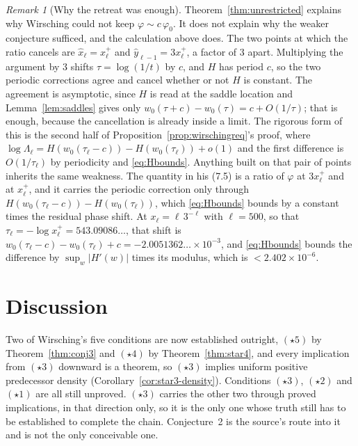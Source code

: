 \documentclass[11pt]{article}
\theoremstyle{definition}
\theoremstyle{remark}
\newtheorem{remark}[theorem]{Remark}
\begin{document}
\begin{remark}[Why the retreat was enough]\label{rem:blindness}
Theorem~\ref{thm:unrestricted} explains why Wirsching could not keep
$\varphi\sim c\,\varphi_0$. It does not explain why the weaker
conjecture sufficed, and the calculation above does. The two points at
which the ratio cancels are $\widehat x_\ell=x_\ell^+$ and
$\widehat y_{\ell-1}=3x_\ell^+$, a factor of $3$ apart. Multiplying the
argument by $3$ shifts $\tau=\log(1/t)$ by $c$, and $H$ has period $c$,
so the two periodic corrections agree and cancel whether or not $H$ is
constant. The agreement is asymptotic, since $H$ is read at the saddle
location and Lemma~\ref{lem:saddles} gives only
$w_0(\tau+c)-w_0(\tau)=c+O(1/\tau)$; that is enough, because the
cancellation is already inside a limit. The rigorous form of this is
the second half of Proposition~\ref{prop:wirschingreq}'s proof, where
$\log\Lambda_\ell = H(w_0(\tau_\ell-c))-H(w_0(\tau_\ell))+o(1)$ and the
first difference is $O(1/\tau_\ell)$ by periodicity and
\eqref{eq:Hbounds}. Anything built on that pair of points inherits the
same weakness. The quantity in his (7.5) is a ratio of $\varphi$ at
$3x_\ell^+$ and at $x_\ell^+$, and it carries the periodic correction
only through $H(w_0(\tau_\ell-c))-H(w_0(\tau_\ell))$, which
\eqref{eq:Hbounds} bounds by a constant times the residual phase shift.
At $x_\ell=\ell\,3^{-\ell}$ with $\ell=500$, so that
$\tau_\ell=-\log x_\ell^+=543.09086\ldots$, that shift is
$w_0(\tau_\ell-c)-w_0(\tau_\ell)+c=-2.0051362\ldots\times10^{-3}$, and
\eqref{eq:Hbounds} bounds the difference by $\sup_w|H'(w)|$ times its
modulus, which is $<2.402\times10^{-6}$.
\end{remark}


\section{Discussion}
\label{sec:discussion}

Two of Wirsching's five conditions are now established outright,
$(\star5)$ by Theorem~\ref{thm:conj3} and $(\star4)$ by
Theorem~\ref{thm:star4}, and every implication from $(\star3)$ downward
is a theorem, so $(\star3)$ implies uniform positive predecessor
density (Corollary~\ref{cor:star3-density}). Conditions $(\star3)$,
$(\star2)$ and $(\star1)$ are all still unproved. $(\star3)$ carries
the other two through proved implications, in that direction only, so
it is the only one whose truth still has to be established to complete
the chain. Conjecture~2 is the source's route
into it and is not the only conceivable one.
\end{document}
